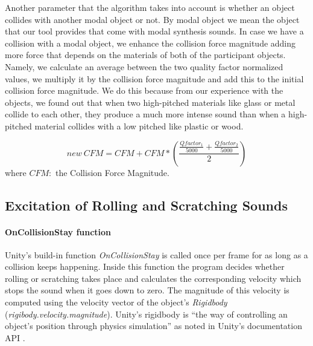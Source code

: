 Another parameter that the algorithm takes into account is whether an object collides with another modal object or not. By modal object we mean the object that our tool provides that come with modal synthesis sounds. In case we have a collision with a modal object, we enhance the collision force magnitude adding more force that depends on the materials of both of the participant objects. Namely, we calculate an average between the two quality factor normalized values, we multiply it by the collision force magnitude and add this to the initial collision force magnitude. We do this because from our experience with the objects, we found out that when two high-pitched materials like glass or metal collide to each other, they produce a much more intense sound than when a high-pitched material collides with a low pitched like plastic or wood.  

\begin{equation}
new\ CFM = CFM + CFM*\left( \frac{\frac{Qfactor_1}{5000} + \frac{Qfactor_2}{5000}}{2} \right)
\end{equation} 
\noindent where $CFM:$ the Collision Force Magnitude.


\subsection{Excitation of Rolling and Scratching Sounds}
\paragraph{OnCollisionStay function\\}

Unity\textsuperscript{\textregistered}'s build-in function \textit{OnCollisionStay} \cite{bib:unity_doc} is called once per frame for as long as a collision keeps happening. Inside this function the program decides whether rolling or scratching takes place and calculates the corresponding velocity which stops the sound when it goes down to zero. The magnitude of this velocity is computed using the velocity vector of the object's \textit{Rigidbody} (\textit{rigibody.velocity.magnitude}). Unity\textsuperscript{\textregistered}'s rigidbody is ``the way of controlling an object's position through physics simulation'' as noted in Unity\textsuperscript{\textregistered}'s documentation API \cite{bib:unity_doc}.

